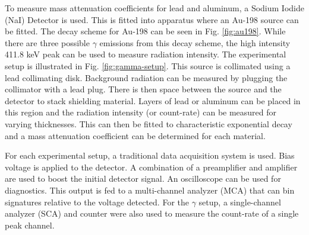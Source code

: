 To measure mass attenuation coefficients for lead and aluminum, a Sodium Iodide (NaI) Detector is used. This is fitted into apparatus where an Au-198 source can be fitted. The decay scheme for Au-198 can be seen in Fig. \ref{fig:au198}. While there are three possible $\gamma$ emissions from this decay scheme, the high intensity 411.8 keV peak can be used to measure radiation intensity. The experimental setup is illustrated in Fig. \ref{fig:gamma-setup}. This source is collimated using a lead collimating disk. Background radiation can be measured by plugging the collimator with a lead plug. There is then space between the source and the detector to stack shielding material. Layers of lead or aluminum can be placed in this region and the radiation intensity (or count-rate) can be measured for varying thicknesses. This can then be fitted to characteristic exponential decay and a mass attenuation coefficient can be determined for each material.

For each experimental setup, a traditional data acquisition system is used. Bias voltage is applied to the detector. A combination of a preamplifier and amplifier are used to boost the initial detector signal. An oscilloscope can be used for diagnostics. This output is fed to a multi-channel analyzer (MCA) that can bin signatures relative to the voltage detected. For the $\gamma$ setup, a single-channel analyzer (SCA) and counter were also used to measure the count-rate of a single peak channel.
